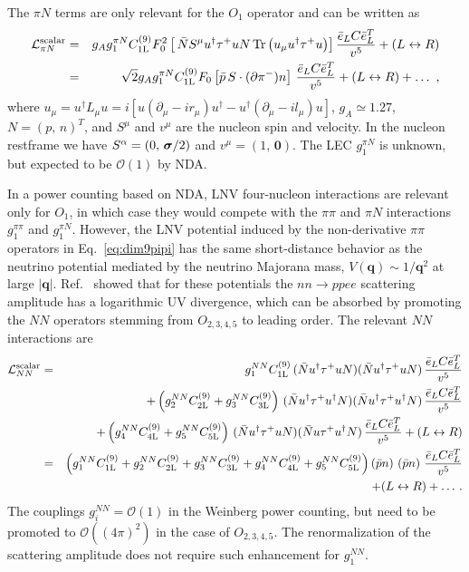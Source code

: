 \documentclass[letterpaper,11pt]{article}
\newcommand{\al}{\alpha}
\newcommand{\vL}{\ensuremath{\mathcal{L}}}
\newcommand{\bea}{\begin{eqnarray}}
\newcommand{\eea}{\end{eqnarray}}
\newcommand{\boldsigma}{\mbox{\boldmath $\sigma$}}
\renewcommand{\vec}[1]{{\mathbf #1}}
\newcommand{\nn}{\nonumber}
\begin{document}
The $\pi N$  terms are only  relevant for the $O_1$ operator and can be written as
\bea\label{eq:dim9PiN}
\vL_{\pi N}^{\rm scalar}& =& g_Ag^{\pi N}_{1}C_{\rm 1L}^{(9)}F_0^2\left[\,\bar N S^\mu u^\dagger\tau^+ u N\,{\rm Tr}\left(u_\mu u^\dagger \tau^+ u \right)\right]\frac{\bar e_L  C\bar e^T_L }{v^5}+(L\leftrightarrow R)\nn\\
&=&\sqrt{2}g_A g^{\pi N}_{1}C_{\rm 1L}^{(9)}F_0 \left[\bar p\, S\cdot (\partial \pi^-)n\right] \, \frac{\bar e_L  C\bar e^T_L}{v^5}+(L\leftrightarrow R)+\dots\,\,,
\eea
where $u_\mu=u^\dagger L_\mu u = i\left[u(\partial_\mu-ir_\mu)u^\dagger -u^\dagger(\partial_\mu-il_\mu)u \right]  $, $g_A \simeq 1.27$, $N = (p,\, n)^T$, and $S^\mu$ and $v^\mu$ are the nucleon spin and velocity. In the nucleon restframe  we have $S^\al = (0,\, \boldsigma/2)$ and $v^\mu = (1,\, \vec 0)$.
The LEC $g_1^{\pi N}$ is unknown, but expected to be $\mathcal O(1)$ by NDA.

In a power counting based on NDA, LNV four-nucleon interactions are relevant only for $O_1$,
 in which case they would compete with the $\pi \pi$ and $\pi N$ interactions $g^{\pi\pi}_{1}$ and $g^{\pi N}_{1}$.
However, the LNV potential induced by the non-derivative $\pi\pi$ operators in Eq.\ \eqref{eq:dim9pipi}
has the same short-distance behavior as the neutrino potential mediated by the neutrino Majorana mass,  $V(\vec q) \sim 1/\vec q^2$ at large $|\vec q|$.
Ref.\ \cite{Cirigliano:2018hja} showed that for these potentials the $nn \rightarrow p p e e$ scattering amplitude  has a logarithmic UV divergence, which can be absorbed by promoting the $N\!N$ operators 
stemming from  $O_{2,3,4,5}$ to leading order. The relevant  $N\!N$ interactions are
\bea\label{eq:dim9NN}
\vL_{NN}^{\rm scalar} &=& g_{1}^{NN} C_{\rm 1L}^{(9)}  \, (\bar N u^\dagger \tau^+ u N)(\bar N u^\dagger \tau^+ u N)\, \frac{\bar e_L  C\bar e^T_L}{v^5}\nn \\
& & +  \left(   g_{2}^{NN} C_{\rm 2L}^{(9)} +  g_{3}^{NN} C_{\rm 3L}^{(9)}  \right)\, (\bar N u^\dagger \tau^+ u^\dagger N)(\bar N u^\dagger \tau^+ u^\dagger N)\, \frac{\bar e_L  C\bar e^T_L}{v^5}  \nn \\
& & +  \left(  g_{4}^{NN} C_{\rm 4L}^{(9)}  +  g_{5}^{NN} C_{\rm 5L}^{(9)}  \right)\, (\bar N u^\dagger \tau^+ u N)(\bar N u \tau^+ u^\dagger N)\, \frac{\bar e_L  C\bar e^T_L}{v^5}
+(L\leftrightarrow R)
\nn\\
& =& \left(  g_{1}^{NN} C_{\rm 1L}^{(9)} +   g_{2}^{NN}  C_{\rm 2L}^{(9)} +  g_{3}^{NN} C_{\rm 3L}^{(9)}  +
 g_{4}^{NN} C_{\rm 4L}^{(9)}  +   g_{5}^{NN} C_{\rm 5L}^{(9)} \right) \left(\bar pn\right )\,\left(\bar pn\right )\, \frac{\bar e_L  C\bar e^T_L}{v^5}\nn \\ & & +(L\leftrightarrow R)+\dots\,.
\eea
The couplings $g_{i}^{NN}  = \mathcal O(1)$ in the Weinberg power counting, but need to be promoted to
$\mathcal O((4\pi)^2)$ in the case of $O_{2,3,4,5}$. The renormalization of the scattering amplitude does not require such enhancement for $g_{1}^{NN}$. 
\end{document}
